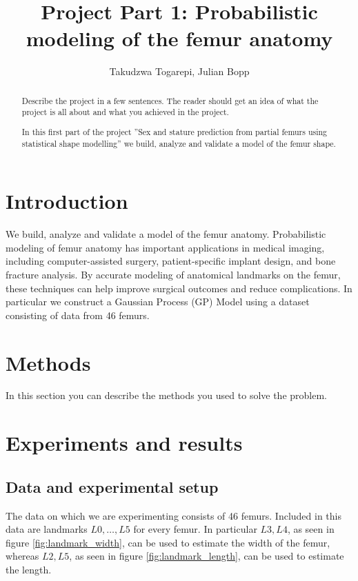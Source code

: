\documentclass[10pt]{article}
\author{Takudzwa Togarepi, Julian Bopp }
\title{Project Part 1: Probabilistic modeling of the femur anatomy}
\begin{document}
\maketitle
\begin{abstract}
    Describe the project in a few sentences. 
    The reader should get an idea of what the project is all about
    and what you achieved in the project.


    In this first part of the project ''Sex and stature prediction from partial femurs using statistical shape modelling'' we build,
    analyze and validate a model of the femur shape.
\end{abstract}

\section{Introduction}

We build, analyze and validate a model of the femur anatomy. Probabilistic modeling of femur anatomy has important applications in medical imaging, including computer-assisted surgery, patient-specific implant design, and bone fracture analysis. By accurate modeling of anatomical landmarks on the femur, these techniques can help improve surgical outcomes and reduce complications. In particular we construct a Gaussian Process (GP) Model using a dataset consisting of data from 46 femurs.
\section{Methods}

In this section you can describe the methods you used to solve the problem.

\newpage
\section{Experiments and results}
\subsection{Data and experimental setup}


The data on which we are experimenting consists of 46 femurs. Included in this data are landmarks $L0,\dots,L5$ for every femur.
In particular $L3,L4$, as seen in figure \ref{fig:landmark_width}, can be used to estimate the width of the femur, whereas $L2,L5$, as seen in figure \ref{fig:landmark_length}, can be used to estimate the length.
\end{document}
